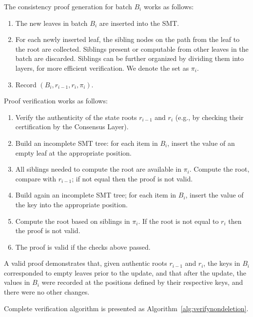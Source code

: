 \documentclass[twocolumn]{article}
\begin{document}
The consistency proof generation for batch $B_i$ works as follows:

\begin{enumerate}
    \item The new leaves in batch $B_i$ are inserted into the SMT.
    \item For each newly inserted leaf, the sibling nodes on the path from the leaf to the root are collected. Siblings present or computable from other leaves in the batch are discarded. Siblings can be further organized by dividing them into layers, for more efficient verification. We denote the set as $\pi_i$.
    \item Record $(B_i, r_{i-1}, r_i, \pi_i)$.
\end{enumerate}

Proof verification works as follows:

\begin{enumerate}
    \item Verify the authenticity of the state roots $r_{i-1}$ and $r_i$ (e.g., by checking their certification by the Consensus Layer).
    \item Build an incomplete SMT tree: for each item in $B_i$, insert the value of an empty leaf at the appropriate position.
    \item All siblings needed to compute the root are available in $\pi_i$. Compute the root, compare with $r_{i-1}$; if not equal then the proof is not valid.
    \item Build again an incomplete SMT tree; for each item in $B_i$, insert the value of the key into the appropriate position.
    \item Compute the root based on siblings in $\pi_i$. If the root is not equal to $r_i$ then the proof is not valid.
    \item The proof is valid if the checks above passed.
\end{enumerate}

A valid proof demonstrates that, given authentic roots $r_{i-1}$ and $r_i$, the keys in $B_i$ corresponded to empty leaves prior to the update, and that after the update, the values in $B_i$ were recorded at the positions defined by their respective keys, and there were no other changes.

Complete verification algorithm is presented as Algorithm~\ref{alg:verifynondeletion}.
\end{document}
